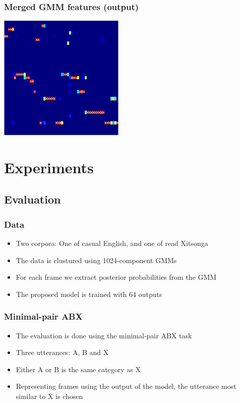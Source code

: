 \documentclass[british]{beamer}
\begin{document}
  \begin{frame}
    \frametitle{Merged GMM features (output)}
   \centering
   \includegraphics[width=6cm]{../report/data/reduced-posteriorgrams-speaker-1-crop}
  \end{frame}

  \section{Experiments}
  \subsection{Evaluation}
  \begin{frame}
    \frametitle{Data}
    
    \begin{itemize}
     \item Two corpora: One of casual English, and one of read Xitsonga
     \item The data is clustured using 1024-component GMMs
     \item For each frame we extract posterior probabilities from the GMM
     \item The proposed model is trained with 64 outputs
    \end{itemize}
    
  \end{frame}

  
  \begin{frame}
    \frametitle{Minimal-pair ABX}
    
    \begin{itemize}
     \item The evaluation is done using the minimal-pair ABX task
     \item Three utterances: A, B and X
     \item Either A or B is the same category as X
     \item Representing frames using the output of the model, the utterance most similar to X is chosen
    \end{itemize}
  \end{frame}
  
\end{document}
